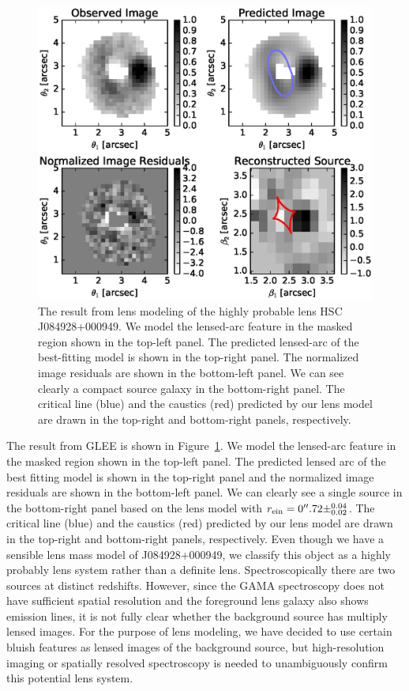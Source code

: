 \documentclass[apj]{emulateapj}
\def\rein{r_{\rm ein}}
\newcommand{\fref}[1]{Figure~\ref{#1}}
\begin{document}
\begin{figure}
\centering
\includegraphics[scale=0.4]{figure/lens_model.eps}
\caption{The result from lens modeling of the highly probable lens HSC J084928+000949. We model the lensed-arc feature in the masked region 
shown in the top-left panel. 
The predicted lensed-arc of the best-fitting model is shown in the top-right panel. The normalized image residuals are shown in the bottom-left panel.
We can see clearly a compact source galaxy in the bottom-right panel. 
The critical line (blue) and the caustics (red) predicted by our lens model are drawn in the top-right and bottom-right panels, respectively. 
} 
\label{fig:lens_model}
\end{figure}

The result from GLEE is shown in \fref{fig:lens_model}. 
We model the lensed-arc feature in the masked region shown in the top-left panel. 
The predicted lensed arc of the best fitting model is shown in the top-right panel and the normalized image residuals are shown in the bottom-left panel.
We can clearly see a single source in the bottom-right panel based on the lens model with 
$\rein = 0\arcsec.72\pm^{0.04}_{0.02}$.
The critical line (blue) and the caustics (red) predicted by our lens model are drawn in the top-right and bottom-right panels, respectively. 
%
Even though we have a sensible lens mass model of J084928+000949, we classify this object as a highly probably lens system rather than a definite lens. 
Spectroscopically there are two sources at distinct redshifts. 
However, since the GAMA spectroscopy does not have sufficient spatial resolution and the foreground lens galaxy also shows emission lines,  
it is not fully clear whether the background source has multiply lensed images. 
For the purpose of lens modeling, we have decided to use certain bluish features as lensed images of the background source, 
but high-resolution imaging or spatially resolved spectroscopy is needed to unambiguously confirm this potential lens system.
\end{document}
